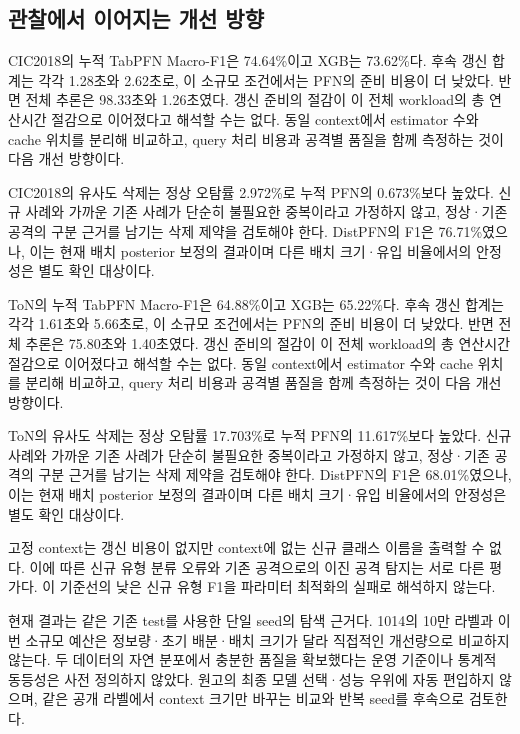 \subsection{관찰에서 이어지는 개선 방향}
CIC2018의 누적 TabPFN Macro-F1은 74.64\%이고 XGB는 73.62\%다. 후속 갱신 합계는 각각 1.28초와 2.62초로, 이 소규모 조건에서는 PFN의 준비 비용이 더 낮았다. 반면 전체 추론은 98.33초와 1.26초였다. 갱신 준비의 절감이 이 전체 workload의 총 연산시간 절감으로 이어졌다고 해석할 수는 없다. 동일 context에서 estimator 수와 cache 위치를 분리해 비교하고, query 처리 비용과 공격별 품질을 함께 측정하는 것이 다음 개선 방향이다.

CIC2018의 유사도 삭제는 정상 오탐률 2.972\%로 누적 PFN의 0.673\%보다 높았다. 신규 사례와 가까운 기존 사례가 단순히 불필요한 중복이라고 가정하지 않고, 정상·기존 공격의 구분 근거를 남기는 삭제 제약을 검토해야 한다. DistPFN의 F1은 76.71\%였으나, 이는 현재 배치 posterior 보정의 결과이며 다른 배치 크기·유입 비율에서의 안정성은 별도 확인 대상이다.

ToN의 누적 TabPFN Macro-F1은 64.88\%이고 XGB는 65.22\%다. 후속 갱신 합계는 각각 1.61초와 5.66초로, 이 소규모 조건에서는 PFN의 준비 비용이 더 낮았다. 반면 전체 추론은 75.80초와 1.40초였다. 갱신 준비의 절감이 이 전체 workload의 총 연산시간 절감으로 이어졌다고 해석할 수는 없다. 동일 context에서 estimator 수와 cache 위치를 분리해 비교하고, query 처리 비용과 공격별 품질을 함께 측정하는 것이 다음 개선 방향이다.

ToN의 유사도 삭제는 정상 오탐률 17.703\%로 누적 PFN의 11.617\%보다 높았다. 신규 사례와 가까운 기존 사례가 단순히 불필요한 중복이라고 가정하지 않고, 정상·기존 공격의 구분 근거를 남기는 삭제 제약을 검토해야 한다. DistPFN의 F1은 68.01\%였으나, 이는 현재 배치 posterior 보정의 결과이며 다른 배치 크기·유입 비율에서의 안정성은 별도 확인 대상이다.

고정 context는 갱신 비용이 없지만 context에 없는 신규 클래스 이름을 출력할 수 없다. 이에 따른 신규 유형 분류 오류와 기존 공격으로의 이진 공격 탐지는 서로 다른 평가다. 이 기준선의 낮은 신규 유형 F1을 파라미터 최적화의 실패로 해석하지 않는다.

현재 결과는 같은 기존 test를 사용한 단일 seed의 탐색 근거다. 1014의 10만 라벨과 이번 소규모 예산은 정보량·초기 배분·배치 크기가 달라 직접적인 개선량으로 비교하지 않는다. 두 데이터의 자연 분포에서 충분한 품질을 확보했다는 운영 기준이나 통계적 동등성은 사전 정의하지 않았다. 원고의 최종 모델 선택·성능 우위에 자동 편입하지 않으며, 같은 공개 라벨에서 context 크기만 바꾸는 비교와 반복 seed를 후속으로 검토한다.

